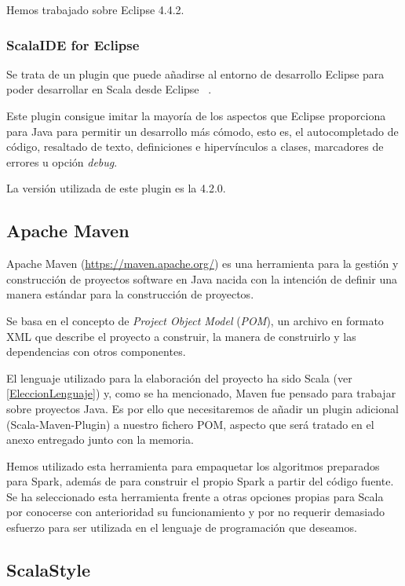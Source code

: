 Hemos trabajado sobre Eclipse 4.4.2.

\subsubsection{ScalaIDE for Eclipse}

Se trata de un plugin que puede añadirse al entorno de desarrollo Eclipse para poder desarrollar en Scala desde Eclipse~\cite{ScalaIDEPage} .

Este plugin consigue imitar la mayoría de los aspectos que Eclipse proporciona para Java para permitir un desarrollo más cómodo, esto es, el autocompletado de código, resaltado de texto, definiciones e hipervínculos a clases, marcadores de errores u opción \textit{debug}.

La versión utilizada de este plugin es la 4.2.0.

\subsection{Apache Maven}

Apache Maven (\url{https://maven.apache.org/}) es una herramienta para la gestión y construcción de proyectos software en Java nacida con la intención de definir una manera estándar para la construcción de proyectos.

Se basa en el concepto de \textit{Project Object Model} (\textit{POM}), un archivo en formato XML que describe el proyecto a construir, la manera de construirlo y  las dependencias con otros componentes.

El lenguaje utilizado para la elaboración del proyecto ha sido Scala (ver \ref{EleccionLenguaje}) y, como se ha mencionado, Maven fue pensado para trabajar sobre proyectos Java. Es por ello que necesitaremos de añadir un plugin adicional (Scala-Maven-Plugin) a nuestro fichero POM, aspecto que será tratado en el anexo entregado junto con la memoria.

Hemos utilizado esta herramienta para empaquetar los algoritmos preparados para Spark, además de para construir el propio Spark a partir del código fuente. Se ha seleccionado esta herramienta frente a otras opciones propias para Scala por conocerse con anterioridad su funcionamiento y por no requerir demasiado esfuerzo para ser utilizada en el lenguaje de programación que deseamos.

\subsection{ScalaStyle}


